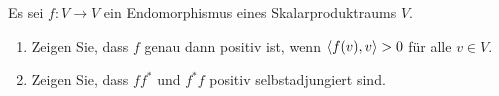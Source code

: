 \documentclass[a4paper, 10pt]{scrartcl}
\begin{document}
\begin{question}
  Es sei $f \colon V \to V$ ein Endomorphismus eines Skalarproduktraums $V$.
  \begin{enumerate}[leftmargin=*]
    \item
      Zeigen Sie, dass $f$ genau dann positiv ist, wenn $\left\langle f(v), v \right\rangle > 0$ für alle $v \in V$.
    \item
      Zeigen Sie, dass $f f^*$ und $f^* f$ positiv selbstadjungiert sind.
  \end{enumerate}
\end{question}











\newpage


\printsolutions
\end{document}
